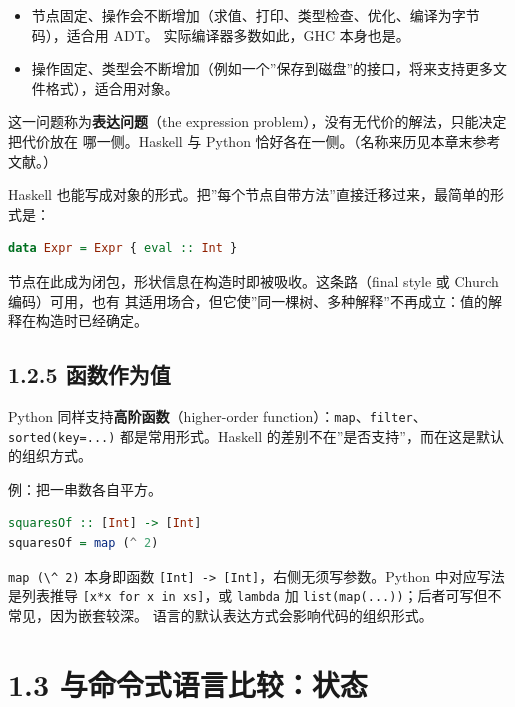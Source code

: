 \begin{itemize}
\tightlist
\item
  节点固定、操作会不断增加（求值、打印、类型检查、优化、编译为字节码），适合用 ADT。
  实际编译器多数如此，GHC 本身也是。
\item
  操作固定、类型会不断增加（例如一个''保存到磁盘''的接口，将来支持更多文件格式），适合用对象。
\end{itemize}

这一问题称为\textbf{表达问题}（the expression problem），没有无代价的解法，只能决定把代价放在
哪一侧。Haskell 与 Python 恰好各在一侧。（名称来历见本章末参考文献。）

Haskell 也能写成对象的形式。把''每个节点自带方法''直接迁移过来，最简单的形式是：

\begin{lstlisting}[language=Haskell]
data Expr = Expr { eval :: Int }
\end{lstlisting}

节点在此成为闭包，形状信息在构造时即被吸收。这条路（final style 或 Church 编码）可用，也有
其适用场合，但它使''同一棵树、多种解释''不再成立：值的解释在构造时已经确定。

\subsection{1.2.5 函数作为值}\label{ux51fdux6570ux4f5cux4e3aux503c}

Python 同样支持\textbf{高阶函数}（higher-order function）：\passthrough{\lstinline!map!}、\passthrough{\lstinline!filter!}、\passthrough{\lstinline!sorted(key=...)!}
都是常用形式。Haskell 的差别不在''是否支持''，而在这是默认的组织方式。

例：把一串数各自平方。

\begin{lstlisting}[language=Haskell]
squaresOf :: [Int] -> [Int]
squaresOf = map (^ 2)
\end{lstlisting}

\passthrough{\lstinline!map (\^ 2)!} 本身即函数 \passthrough{\lstinline![Int] -> [Int]!}，右侧无须写参数。Python 中对应写法是列表推导
\passthrough{\lstinline![x*x for x in xs]!}，或 \passthrough{\lstinline!lambda!} 加 \passthrough{\lstinline!list(map(...))!}；后者可写但不常见，因为嵌套较深。
语言的默认表达方式会影响代码的组织形式。

\section{1.3 与命令式语言比较：状态}\label{ux4e0eux547dux4ee4ux5f0fux8bedux8a00ux6bd4ux8f83ux72b6ux6001}

